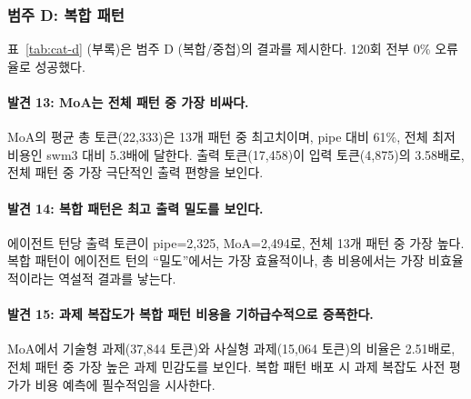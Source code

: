 \documentclass[a4paper,11pt]{article}
\begin{document}
\subsubsection{범주 D: 복합 패턴}

표~\ref{tab:cat-d} (부록)은 범주 D (복합/중첩)의 결과를 제시한다. 120회 전부 0\% 오류율로 성공했다.



\paragraph{발견 13: MoA는 전체 패턴 중 가장 비싸다.}
MoA의 평균 총 토큰(22,333)은 13개 패턴 중 최고치이며, pipe 대비 61\%, 전체 최저 비용인 swm3 대비 5.3배에 달한다. 출력 토큰(17,458)이 입력 토큰(4,875)의 3.58배로, 전체 패턴 중 가장 극단적인 출력 편향을 보인다.

\paragraph{발견 14: 복합 패턴은 최고 출력 밀도를 보인다.}
에이전트 턴당 출력 토큰이 pipe=2,325, MoA=2,494로, 전체 13개 패턴 중 가장 높다. 복합 패턴이 에이전트 턴의 ``밀도''에서는 가장 효율적이나, 총 비용에서는 가장 비효율적이라는 역설적 결과를 낳는다.

\paragraph{발견 15: 과제 복잡도가 복합 패턴 비용을 기하급수적으로 증폭한다.}
MoA에서 기술형 과제(37,844 토큰)와 사실형 과제(15,064 토큰)의 비율은 2.51배로, 전체 패턴 중 가장 높은 과제 민감도를 보인다. 복합 패턴 배포 시 과제 복잡도 사전 평가가 비용 예측에 필수적임을 시사한다.
\end{document}
